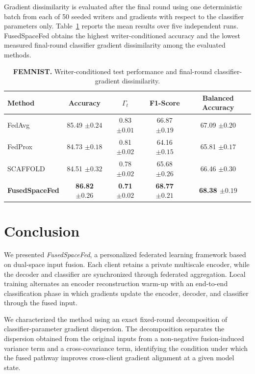 \documentclass[twoside]{article}
\theoremstyle{thmstyleone}%
\theoremstyle{thmstyletwo}%
\theoremstyle{thmstylethree}%
\begin{document}
Gradient dissimilarity is evaluated after the final round using one
deterministic batch from each of 50 seeded writers and gradients with respect
to the classifier parameters only. Table~\ref{tab:femnist_results} reports the
mean results over five independent runs. FusedSpaceFed obtains the highest
writer-conditioned accuracy and the lowest measured final-round classifier
gradient dissimilarity among the evaluated methods.

\begin{table}[t]
\centering
\caption{\textbf{FEMNIST.} Writer-conditioned test performance and final-round classifier-gradient dissimilarity.}
\label{tab:femnist_results}
\begin{tabular}{lcccc}
\toprule
Method & Accuracy & $\Gamma_t$ & F1-Score & Balanced Accuracy \\
\midrule
FedAvg    & 85.49 $\pm 0.24$   & 0.83 $\pm 0.01$ & 66.87 $\pm 0.19$ & 67.09 $\pm 0.20$ \\
FedProx   & 84.73 $\pm 0.18$   & 0.81 $\pm 0.02$  & 64.16 $\pm 0.15$ & 65.81 $\pm 0.17$ \\
SCAFFOLD  & 84.51 $\pm 0.32$  & 0.78 $\pm 0.02$  & 65.68 $\pm 0.26$ & 66.46 $\pm 0.30$ \\
\textbf{FusedSpaceFed} & \textbf{86.82 $\pm 0.26$} & \textbf{0.71 $\pm 0.02$} & \textbf{68.77 $\pm 0.21$} & \textbf{68.38 $\pm 0.19$} \\
\bottomrule
\end{tabular}
\end{table}





\section{Conclusion}\label{sec:conclusion}


We presented \emph{FusedSpaceFed}, a personalized federated learning framework
based on dual-space input fusion. Each client retains a private multiscale
encoder, while the decoder and classifier are synchronized through federated
aggregation. Local training alternates an encoder reconstruction warm-up
with an end-to-end classification phase in which gradients update the encoder,
decoder, and classifier through the fused input.

We characterized the method using an exact fixed-round decomposition of
classifier-parameter gradient dispersion. The decomposition separates the
dispersion obtained from the original inputs from a non-negative
fusion-induced variance term and a cross-covariance term, identifying the
condition under which the fused pathway improves cross-client gradient
alignment at a given model state.
\end{document}
